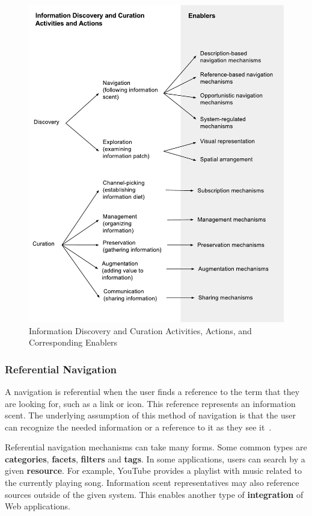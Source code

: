 \documentclass{sigchi}
\begin{document}
{{\begin{figure}[ht!]
	\noindent
	\centering
    \includegraphics[width=\linewidth]{figures/framework_enablers.pdf}
	\caption{Information Discovery and Curation Activities, Actions, and Corresponding Enablers}
	\label{fig:enablers} 
\end{figure}


{\subsubsection{Referential Navigation}
A navigation is referential when the user finds a reference to the term that they are looking for, such as a link or icon. This reference represents an information scent. The underlying assumption of this method of navigation is that the user can recognize the needed information or a reference to it as they see it~\cite{waterworth1991model}. 

Referential navigation mechanisms can take many forms. Some common types are \textbf{categories}, \textbf{facets}, \textbf{filters} and \textbf{tags}. In some applications, users can search by a given \textbf{resource}. For example, YouTube provides a playlist with music related to the currently playing song. Information scent representatives may also reference sources outside of the given system. This enables another type of \textbf{integration} of Web applications. 

}}}
\end{document}

